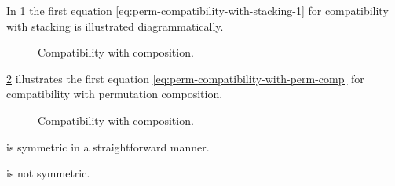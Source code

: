 In \cref{fig:compatibility-with-stacking} the first equation \cref{eq:perm-compatibility-with-stacking-1} for compatibility with stacking is illustrated diagrammatically.

\begin{figure}[h]
    \centering
     \qquad \qquad
    \caption{Compatibility with composition. }
    \label{fig:compatibility-with-stacking}
\end{figure}

\cref{fig:compatibility-perm-comp} illustrates the first equation \cref{eq:perm-compatibility-with-perm-comp} for compatibility with permutation composition.

\begin{figure}[h]
    \centering
     \qquad \qquad
    \caption{Compatibility with composition. }
    \label{fig:compatibility-perm-comp}
\end{figure}


\begin{example}
    \SetL is symmetric in a straightforward manner.
\end{example}

\begin{lemma}
    \Effects is not symmetric.
\end{lemma}


